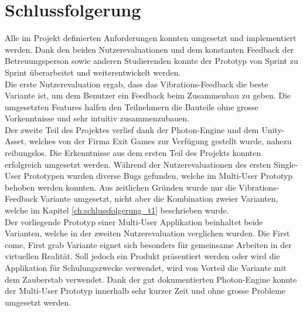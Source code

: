 \chapter{Schlussfolgerung}
\label{ch:Schlussfolgerung}

Alle im Projekt definierten Anforderungen konnten umgesetzt und implementiert werden. Dank den beiden Nutzerevaluationen und dem konstanten Feedback der Betreuungsperson sowie anderen Studierenden konnte der Prototyp von Sprint zu Sprint überarbeitet und weiterentwickelt werden. \\

\noindent Die erste Nutzerevaluation ergab, dass das Vibrations-Feedback die beste Variante ist, um dem Benutzer ein Feedback beim Zusammenbau zu geben. Die umgesetzten Features halfen den Teilnehmern die Bauteile ohne grosse Vorkenntnisse und sehr intuitiv zusammenzubauen. \\

\noindent Der zweite Teil des Projektes verlief dank der Photon-Engine und dem Unity-Asset, welches von der Firma Exit Games zur Verfügung gestellt wurde, nahezu reibungslos. Die Erkenntnisse aus dem ersten Teil des Projekts konnten erfolgreich umgesetzt werden. Während der Nutzerevaluationen des ersten Single-User Prototypen wurden diverse Bugs gefunden, welche im Multi-User Prototyp behoben werden konnten. Aus zeitlichen Gründen wurde nur die Vibrations-Feedback Variante umgesetzt, nicht aber die Kombination zweier Varianten, welche im Kapitel \ref{ch:schlussfolgerung_t1} beschrieben wurde. \\

\noindent Der vorliegende Prototyp einer Multi-User Applikation beinhaltet beide Varianten, welche in der zweiten Nutzerevaluation verglichen wurden. Die \grqq First come, First grab\grqq{} Variante eignet sich besonders für gemeinsame Arbeiten in der virtuellen Realität. Soll jedoch ein Produkt präsentiert werden oder wird die Applikation für Schulungszwecke verwendet, wird von Vorteil die Variante mit dem Zauberstab verwendet. Dank der gut dokumentierten Photon-Engine konnte der Multi-User Prototyp innerhalb sehr kurzer Zeit und ohne grosse Probleme umgesetzt werden. 